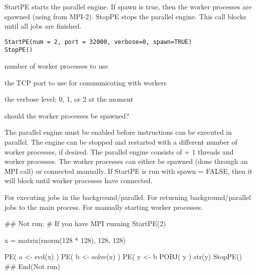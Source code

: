 \documentclass{article}
\begin{document}
\begin{Description}\relax
StartPE starts the parallel engine.  If spawn is true, then the worker
processes are spawned (using  from MPI-2).
StopPE stops the parallel engine.  This call blocks until all jobs
are finished.
\end{Description}
\begin{Usage}
\begin{verbatim}
StartPE(num = 2, port = 32000, verbose=0, spawn=TRUE)
StopPE()
\end{verbatim}
\end{Usage}
\begin{Arguments}
\begin{ldescription}
\item[\code{num}] number of worker processes to use 
\item[\code{port}] the TCP port to use for communicating with workers 
\item[\code{verbose}] the verbose level: 0, 1, or 2 at the moment 
\item[\code{spawn}] should the worker processes be spawned? 
\end{ldescription}
\end{Arguments}
\begin{Details}\relax
The parallel engine must be enabled before instructions can be executed
in parallel.  The engine can be stopped and restarted with a different
number of worker processes, if desired.
The parallel engine consists of  + 1 threads and 
worker processes.  The worker processes can either be spawned (done
through an MPI call) or connected manually.  If StartPE is run with
spawn = FALSE, then it will block until  worker processes
have connected.
\end{Details}
\begin{SeeAlso}\relax
{}  For executing jobs in the background/parallel.
  For returning background/parallel jobs to the main process.
  For manually starting worker processes.
\end{SeeAlso}
\begin{Examples}
\begin{ExampleCode}
## Not run: 
# If you have MPI running
StartPE(2)

x = matrix(rnorm(128 * 128), 128, 128)

PE( a <- svd(x) )
PE( b <- solve(x) )
PE( y <- b %
POBJ( y )
str(y)
StopPE()
## End(Not run)
\end{ExampleCode}
\end{Examples}
\end{document}
